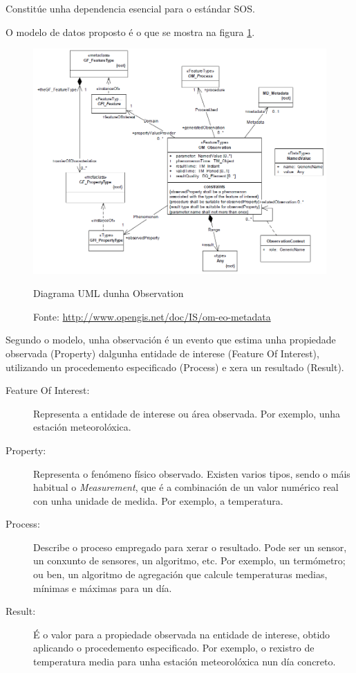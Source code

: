 Constitúe unha dependencia esencial para o estándar SOS.

O modelo de datos proposto é o que se mostra na figura \ref{fig:uml-om}.
\begin{figure}[hbtp]
  \centering
  \includegraphics[width=.8\textwidth]{images/uml-observations.png}
  \caption{Diagrama UML dunha Observation}
  \label{fig:uml-om}
  \caption*{Fonte: \url{http://www.opengis.net/doc/IS/om-eo-metadata}}
\end{figure}

Segundo o modelo, unha observación é un evento que estima unha propiedade observada (Property) dalgunha entidade de interese (Feature Of Interest), utilizando un procedemento especificado (Process) e xera un resultado (Result).

\begin{description}
\item[Feature Of Interest:] Representa a entidade de interese ou área observada. Por exemplo, unha estación meteorolóxica. 
\item[Property:] Representa o fenómeno físico observado. Existen varios tipos, sendo o máis habitual o \emph{Measurement}, que é a combinación de un valor numérico real con unha unidade de medida. Por exemplo, a temperatura.
\item[Process:] Describe o proceso empregado para xerar o resultado. Pode ser un sensor, un conxunto de sensores, un algoritmo, etc. Por exemplo, un termómetro; ou ben, un algoritmo de agregación que calcule temperaturas medias, mínimas e máximas para un día.
\item[Result:] É o valor para a propiedade observada na entidade de interese, obtido aplicando o procedemento especificado. Por exemplo, o rexistro de temperatura media para unha estación meteorolóxica nun día concreto.
\end{description}


